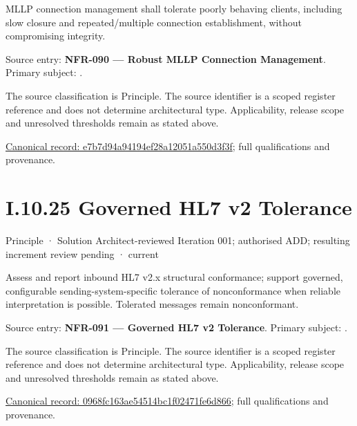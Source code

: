 MLLP connection management shall tolerate poorly behaving clients, including slow closure and repeated/multiple connection establishment, without compromising integrity.



Source entry: \textbf{NFR-090 — Robust MLLP Connection Management}. Primary subject: \texttt{}.



The source classification is Principle. The source identifier is a scoped register reference and does not determine architectural type. Applicability, release scope and unresolved thresholds remain as stated above.


{\footnotesize \href{../../../../../../../continuum/motivation/principle/e7b7d94a94194ef28a12051a550d3f3f.md}{Canonical record: e7b7d94a94194ef28a12051a550d3f3f}; full qualifications and provenance.}\par
\section*{I.10.25 Governed HL7 v2 Tolerance}
\label{navigation:I.10.25}

\label{element:0968fc163ae54514bc1f02471fe6d866}
{\small Principle · Solution Architect-reviewed Iteration 001; authorised ADD; resulting increment review pending · current}\par

Assess and report inbound HL7 v2.x structural conformance; support governed, configurable sending-system-specific tolerance of nonconformance when reliable interpretation is possible. Tolerated messages remain nonconformant.



Source entry: \textbf{NFR-091 — Governed HL7 v2 Tolerance}. Primary subject: \texttt{}.



The source classification is Principle. The source identifier is a scoped register reference and does not determine architectural type. Applicability, release scope and unresolved thresholds remain as stated above.


{\footnotesize \href{../../../../../../../continuum/motivation/principle/0968fc163ae54514bc1f02471fe6d866.md}{Canonical record: 0968fc163ae54514bc1f02471fe6d866}; full qualifications and provenance.}\par

